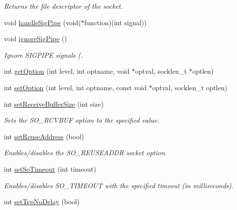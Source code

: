 \begin{DoxyCompactItemize}
\begin{DoxyCompactList}\small\item\em Returns the file descriptor of the socket. \end{DoxyCompactList}\item 
void \hyperlink{classServerSocket_afe81d7c30d1e963e6a043b868560dbbd}{handle\-Sig\-Pipe} (void($\ast$function)(int signal))
\item 
void \hyperlink{classServerSocket_ac159a12414df54dfef149a8de6aacb20}{ignore\-Sig\-Pipe} ()
\begin{DoxyCompactList}\small\item\em Ignore S\-I\-G\-P\-I\-P\-E signals (. \end{DoxyCompactList}\item 
int \hyperlink{classServerSocket_a7ad8a5581c52046e641b32d96eb23406}{get\-Option} (int level, int optname, void $\ast$optval, socklen\-\_\-t $\ast$optlen)
\item 
int \hyperlink{classServerSocket_ad69fa5c5891f028192a291044b9191e2}{set\-Option} (int level, int optname, const void $\ast$optval, socklen\-\_\-t optlen)
\item 
\hypertarget{classServerSocket_ab34154bc6114c638ae02f5e018121099}{int \hyperlink{classServerSocket_ab34154bc6114c638ae02f5e018121099}{set\-Receive\-Buffer\-Size} (int size)}\label{classServerSocket_ab34154bc6114c638ae02f5e018121099}

\begin{DoxyCompactList}\small\item\em Sets the S\-O\-\_\-\-R\-C\-V\-B\-U\-F option to the specified value. \end{DoxyCompactList}\item 
\hypertarget{classServerSocket_ae60d7cc31ad535e5d3cac42e38b8ec98}{int \hyperlink{classServerSocket_ae60d7cc31ad535e5d3cac42e38b8ec98}{set\-Reuse\-Address} (bool)}\label{classServerSocket_ae60d7cc31ad535e5d3cac42e38b8ec98}

\begin{DoxyCompactList}\small\item\em Enables/disables the S\-O\-\_\-\-R\-E\-U\-S\-E\-A\-D\-D\-R socket option. \end{DoxyCompactList}\item 
\hypertarget{classServerSocket_aedb9144c9c375fcb14ac47bcb9d2eb17}{int \hyperlink{classServerSocket_aedb9144c9c375fcb14ac47bcb9d2eb17}{set\-So\-Timeout} (int timeout)}\label{classServerSocket_aedb9144c9c375fcb14ac47bcb9d2eb17}

\begin{DoxyCompactList}\small\item\em Enables/disables S\-O\-\_\-\-T\-I\-M\-E\-O\-U\-T with the specified timeout (in milliseconds). \end{DoxyCompactList}\item 
\hypertarget{classServerSocket_a9e5e1ee852ba26156c757a0086b780fe}{int \hyperlink{classServerSocket_a9e5e1ee852ba26156c757a0086b780fe}{set\-Tcp\-No\-Delay} (bool)}\label{classServerSocket_a9e5e1ee852ba26156c757a0086b780fe}


\end{DoxyCompactItemize}
